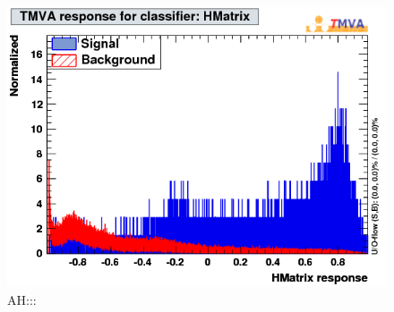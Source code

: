 \documentclass[a4paper]{jpconf}
\begin{document}
\begin{figure}[h]
\begin{center}
\includegraphics[width=1.0\textwidth]{images/mva_HMatrix.png}
\caption{\label{label}AH:::}
\end{center}
\end{figure}


\begin{figure}[h]
\begin{center}

\label{fig:neutronAl}
\end{center}
\end{figure}




\end{document}

